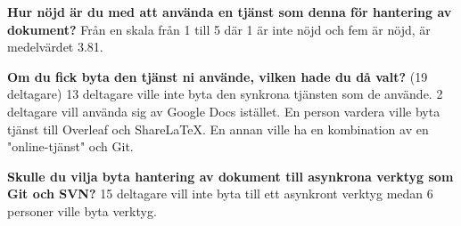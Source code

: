 
\textbf{Hur nöjd är du med att använda en tjänst som denna för hantering av dokument?}
Från en skala från 1 till 5 där 1 är inte nöjd och fem är nöjd, är medelvärdet 3.81.

\textbf{Om du fick byta den tjänst ni använde, vilken hade du då valt?} (19 deltagare)
13 deltagare ville inte byta den synkrona tjänsten som de använde. 2 deltagare vill använda sig av Google Docs istället. En person vardera ville byta tjänst till Overleaf och ShareLaTeX. En annan ville ha en kombination av en "online-tjänst" och Git.

\textbf{Skulle du vilja byta hantering av dokument till asynkrona verktyg som Git och SVN?}
15 deltagare vill inte byta till ett asynkront verktyg medan 6 personer ville byta verktyg.


